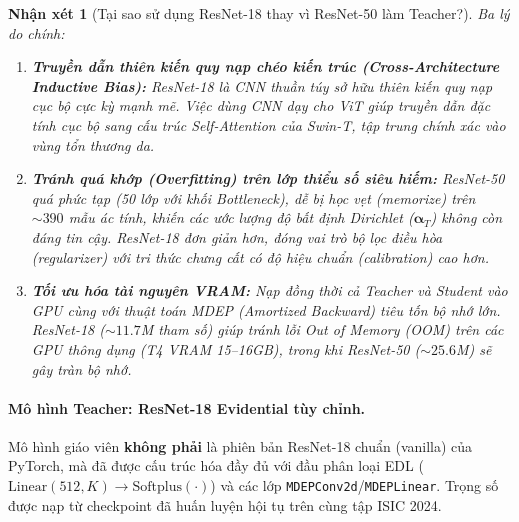 \documentclass[11pt, a4paper]{article}
\newcommand{\softplus}{\text{Softplus}}
\newtheorem{remark}{Nhận xét}
\begin{document}
\begin{remark}[Tại sao sử dụng ResNet-18 thay vì ResNet-50 làm Teacher?]
Ba lý do chính:
\begin{enumerate}[label=(\roman*)]
    \item \textbf{Truyền dẫn thiên kiến quy nạp chéo kiến trúc (Cross-Architecture Inductive Bias):} ResNet-18 là CNN thuần túy sở hữu thiên kiến quy nạp cục bộ cực kỳ mạnh mẽ. Việc dùng CNN dạy cho ViT giúp truyền dẫn đặc tính cục bộ sang cấu trúc Self-Attention của Swin-T, tập trung chính xác vào vùng tổn thương da.
    \item \textbf{Tránh quá khớp (Overfitting) trên lớp thiểu số siêu hiếm:} ResNet-50 quá phức tạp (50 lớp với khối Bottleneck), dễ bị học vẹt (memorize) trên ${\sim}390$ mẫu ác tính, khiến các ước lượng độ bất định Dirichlet ($\bm{\alpha}_T$) không còn đáng tin cậy. ResNet-18 đơn giản hơn, đóng vai trò bộ lọc điều hòa (regularizer) với tri thức chưng cất có độ hiệu chuẩn (calibration) cao hơn.
    \item \textbf{Tối ưu hóa tài nguyên VRAM:} Nạp đồng thời cả Teacher và Student vào GPU cùng với thuật toán MDEP (Amortized Backward) tiêu tốn bộ nhớ lớn. ResNet-18 (${\sim}11.7$M tham số) giúp tránh lỗi Out of Memory (OOM) trên các GPU thông dụng (T4 VRAM 15--16GB), trong khi ResNet-50 (${\sim}25.6$M) sẽ gây tràn bộ nhớ.
\end{enumerate}
\end{remark}

\paragraph{Mô hình Teacher: ResNet-18 Evidential tùy chỉnh.}
Mô hình giáo viên \textbf{không phải} là phiên bản ResNet-18 chuẩn (vanilla) của PyTorch, mà đã được cấu trúc hóa đầy đủ với đầu phân loại EDL ($\text{Linear}(512, K) \to \softplus(\cdot)$) và các lớp \texttt{MDEPConv2d}/\texttt{MDEPLinear}. Trọng số được nạp từ checkpoint đã huấn luyện hội tụ trên cùng tập ISIC 2024.
\end{document}
